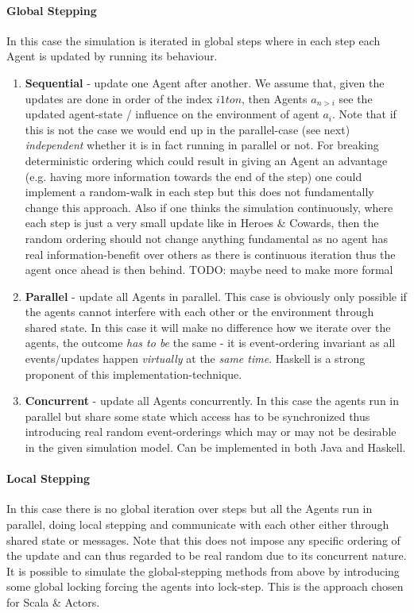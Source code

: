 \paragraph{Global Stepping}
In this case the simulation is iterated in global steps where in each step each Agent is updated by running its behaviour.

\begin{enumerate}
\item \textbf{Sequential} - update one Agent after another. We assume that, given the updates are done in order of the index $i 1 to n$, then Agents $a_{n>i}$ see the updated agent-state / influence on the environment of agent $a_i$. Note that if this is not the case we would end up in the parallel-case (see next) \textit{independent} whether it is in fact running in parallel or not. For breaking deterministic ordering which could result in giving an Agent an advantage (e.g. having more information towards the end of the step) one could implement a random-walk in each step but this does not fundamentally change this approach. Also if one thinks the simulation continuously, where each step is just a very small update like in Heroes \& Cowards, then the random ordering should not change anything fundamental as no agent has real information-benefit over others as there is continuous iteration thus the agent once ahead is then behind. TODO: maybe need to make more formal

\item \textbf{Parallel} - update all Agents in parallel. This case is obviously only possible if the agents cannot interfere with each other or the environment through shared state. In this case it will make no difference how we iterate over the agents, the outcome \textit{has to be} the same - it is event-ordering invariant as all events/updates happen \textit{virtually} at the \textit{same time}. Haskell is a strong proponent of this implementation-technique.

\item \textbf{Concurrent} - update all Agents concurrently. In this case the agents run in parallel but share some state which access has to be synchronized thus introducing real random event-orderings which may or may not be desirable in the given simulation model. Can be implemented in both Java and Haskell.
\end{enumerate}

\paragraph{Local Stepping}
In this case there is no global iteration over steps but all the Agents run in parallel, doing local stepping and communicate with each other either through shared state or messages. Note that this does not impose any specific ordering of the update and can thus regarded to be real random due to its concurrent nature. It is possible to simulate the global-stepping methods from above by introducing some global locking forcing the agents into lock-step. This is the approach chosen for Scala \& Actors.

